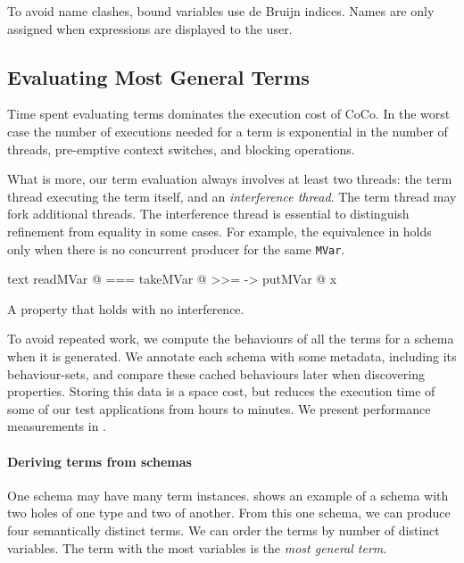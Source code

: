 To avoid name clashes, bound variables use de Bruijn
indices\cite{debruijn1972}.  Names are only assigned when expressions
are displayed to the user.

\subsection{Evaluating Most General Terms}
\label{sec:coco-hiw-eval}

Time spent evaluating terms dominates the execution cost of CoCo.  In
the worst case the number of executions needed for a term is
exponential in the number of threads, pre-emptive context switches,
and blocking operations\cite{musuvathi2007}.

What is more, our term evaluation always involves at least two
threads: the term thread executing the term itself, and an
\emph{interference thread}.  The term thread may fork additional
threads.  The interference thread is essential to distinguish
refinement from equality in some cases.  For example, the equivalence
in  holds only when there is no concurrent
producer for the same \verb|MVar|.

\begin{listing}
\centering
\begin{cminted}{text}
readMVar @  ===  takeMVar @ >>= \x -> putMVar @ x
\end{cminted}
\caption{A property that holds with no interference.}\label{lst:prop_mvar3}
\end{listing}

To avoid repeated work, we compute the behaviours of all the terms for
a schema when it is generated.  We annotate each schema with some
metadata, including its behaviour-sets, and compare these cached
behaviours later when discovering properties.  Storing this data is a
space cost, but reduces the execution time of some of our test
applications from hours to minutes.  We present performance
measurements in .

\paragraph{Deriving terms from schemas}
One schema may have many term instances.   shows
an example of a schema with two holes of one type and two of another.
From this one schema, we can produce four semantically distinct terms.
We can order the terms by number of distinct variables.  The term with
the most variables is the \emph{most general term}.

